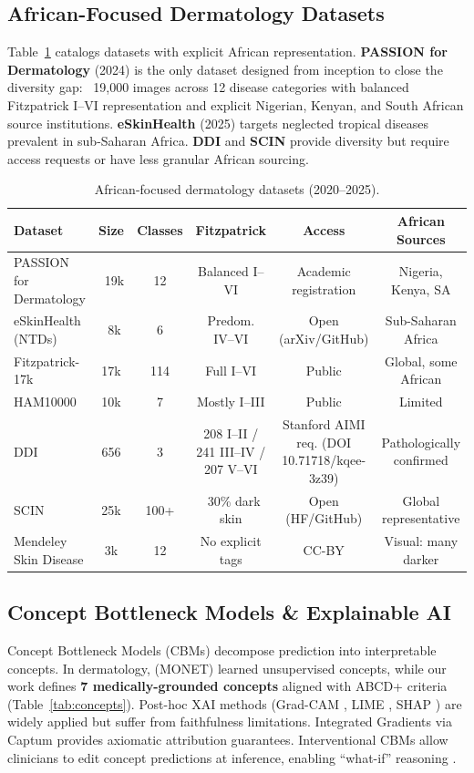 \documentclass[12pt,a4paper]{article}
\begin{document}
\subsection{African-Focused Dermatology Datasets}

Table~\ref{tab:african_datasets} catalogs datasets with explicit African representation. \textbf{PASSION for Dermatology} (2024) is the only dataset designed from inception to close the diversity gap: ~19,000 images across 12 disease categories with balanced Fitzpatrick I--VI representation and explicit Nigerian, Kenyan, and South African source institutions. \textbf{eSkinHealth} (2025) targets neglected tropical diseases prevalent in sub-Saharan Africa. \textbf{DDI} and \textbf{SCIN} provide diversity but require access requests or have less granular African sourcing.

\begin{table}[htbp]
\centering
\caption{African-focused dermatology datasets (2020--2025).}
\label{tab:african_datasets}
\begin{tabular}{lccccc}
\toprule
\textbf{Dataset} & \textbf{Size} & \textbf{Classes} & \textbf{Fitzpatrick} & \textbf{Access} & \textbf{African Sources} \\
\midrule
PASSION for Dermatology & ~19k & 12 & Balanced I--VI & Academic registration & Nigeria, Kenya, SA \\
eSkinHealth (NTDs) & ~8k & 6 & Predom. IV--VI & Open (arXiv/GitHub) & Sub-Saharan Africa \\
Fitzpatrick-17k & 17k & 114 & Full I--VI & Public & Global, some African \\
HAM10000 & 10k & 7 & Mostly I--III & Public & Limited \\
DDI & 656 & 3 & 208 I--II / 241 III--IV / 207 V--VI & Stanford AIMI req. (DOI 10.71718/kqee-3z39) & Pathologically confirmed \\
SCIN & 25k & 100+ & ~30\% dark skin & Open (HF/GitHub) & Global representative \\
Mendeley Skin Disease & 3k & 12 & No explicit tags & CC-BY & Visual: many darker \\
\bottomrule
\end{tabular}
\end{table}

\subsection{Concept Bottleneck Models \& Explainable AI}

Concept Bottleneck Models (CBMs) \cite{koh2020concept} decompose prediction into interpretable concepts. In dermatology, \cite{sawada2022concept} (MONET) learned unsupervised concepts, while our work defines \textbf{7 medically-grounded concepts} aligned with ABCD+ criteria (Table~\ref{tab:concepts}). Post-hoc XAI methods (Grad-CAM \cite{selvaraju2017gradcam}, LIME \cite{ribeiro2016why}, SHAP \cite{lundberg2017unified}) are widely applied but suffer from faithfulness limitations. Integrated Gradients \cite{sundararajan2017axiomatic} via Captum provides axiomatic attribution guarantees. Interventional CBMs allow clinicians to edit concept predictions at inference, enabling ``what-if'' reasoning \cite{koh2020concept}.
\end{document}
